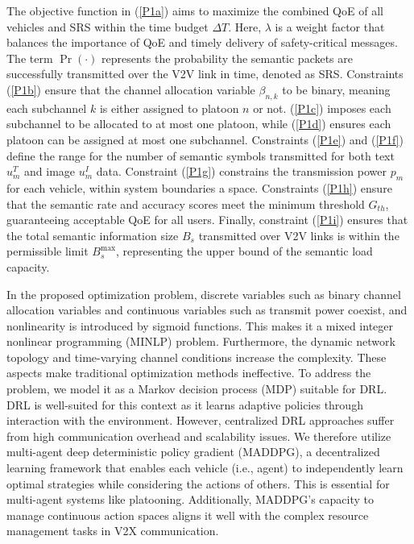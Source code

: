 \documentclass[10pt, lettersize,journal]{IEEEtran}
\begin{document}
	The objective function in (\ref{P1a}) aims to maximize the combined QoE of all vehicles and SRS within the time budget ${\Delta T}$. Here, $\lambda $ is a weight factor that balances the importance of QoE and timely delivery of safety-critical messages. The term $\Pr \left(  \cdot  \right)$ represents the probability the semantic packets are successfully transmitted over the V2V link in time, denoted as SRS.
	Constraints (\ref{P1b}) ensure that the channel allocation variable ${\beta _{n,k}}$ to be binary, meaning each subchannel $k$ is either assigned to platoon $n$ or not. (\ref{P1c}) imposes each subchannel to be allocated to at most one platoon, while (\ref{P1d}) ensures each platoon can be assigned at most one subchannel. 
	Constraints (\ref{P1e}) and (\ref{P1f}) define the range for the number of semantic symbols transmitted for both text ${u_m^T}$ and image ${u_m^I}$ data.
	Constraint (\ref{P1g}) constrains the transmission power ${p_m}$ for each vehicle, within system boundaries a space. Constraints (\ref{P1h}) ensure that the semantic rate and accuracy scores meet the minimum threshold ${G_{th}}$, guaranteeing acceptable QoE for all users. Finally, constraint (\ref{P1i}) ensures that the total semantic information size ${{B_s}}$ transmitted over V2V links is within the permissible limit $B_s^{\max }$, representing the upper bound of the semantic load capacity.
	
    In the proposed optimization problem, discrete variables such as binary channel allocation variables and continuous variables such as transmit power coexist, and nonlinearity is introduced by sigmoid functions. This makes it a mixed integer nonlinear programming (MINLP) problem. Furthermore, the dynamic network topology and time-varying channel conditions increase the complexity. These aspects make traditional optimization methods ineffective. To address the problem, we model it as a Markov decision process (MDP) suitable for DRL. DRL is well-suited for this context as it learns adaptive policies through interaction with the environment\cite{n4}. However, centralized DRL approaches suffer from high communication overhead and scalability issues. We therefore utilize multi-agent deep deterministic policy gradient (MADDPG), a decentralized learning framework that enables each vehicle (i.e., agent) to independently learn optimal strategies while considering the actions of others. This is essential for multi-agent systems like platooning. Additionally, MADDPG’s capacity to manage continuous action spaces aligns it well with the complex resource management tasks in V2X communication.
	
\end{document}
